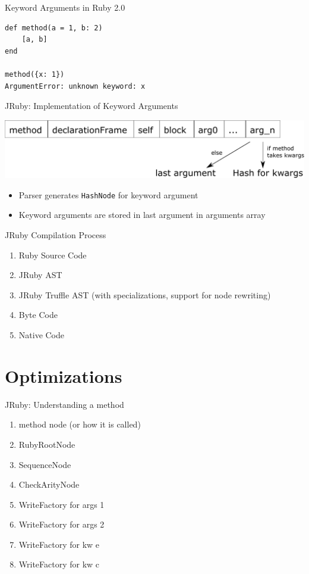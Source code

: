 \documentclass[xcolor=dvipsname,handout]{beamer} %
\begin{document}
\begin{frame}[fragile]{Keyword Arguments in Ruby 2.0}
\begin{lstlisting}
def method(a = 1, b: 2)
    [a, b]
end

method({x: 1})
ArgumentError: unknown keyword: x
\end{lstlisting}
\end{frame}

\begin{frame}{JRuby: Implementation of Keyword Arguments}
\begin{table}
    \centering
    \includegraphics[width=\textwidth]{method_args_array.pdf}
\end{table}

\begin{itemize}
    \item Parser generates \lstinline{HashNode} for keyword argument
    \item Keyword arguments are stored in last argument in arguments array
\end{itemize}
\end{frame}

\begin{frame}{JRuby Compilation Process}
\begin{enumerate}
    \item Ruby Source Code
    \item JRuby AST
    \item JRuby Truffle AST (with specializations, support for node rewriting)
    \item Byte Code
    \item Native Code 
\end{enumerate}
\end{frame}

\section{Optimizations}


\begin{frame}{JRuby: Understanding a method}
\begin{enumerate}
 \item method node (or how it is called)
 \item RubyRootNode
 \item SequenceNode
 \item CheckArityNode
 \item WriteFactory for args 1
 \item WriteFactory for args 2
 \item WriteFactory for kw e
 \item WriteFactory for kw c
\end{enumerate}

\end{frame}
\end{document}
